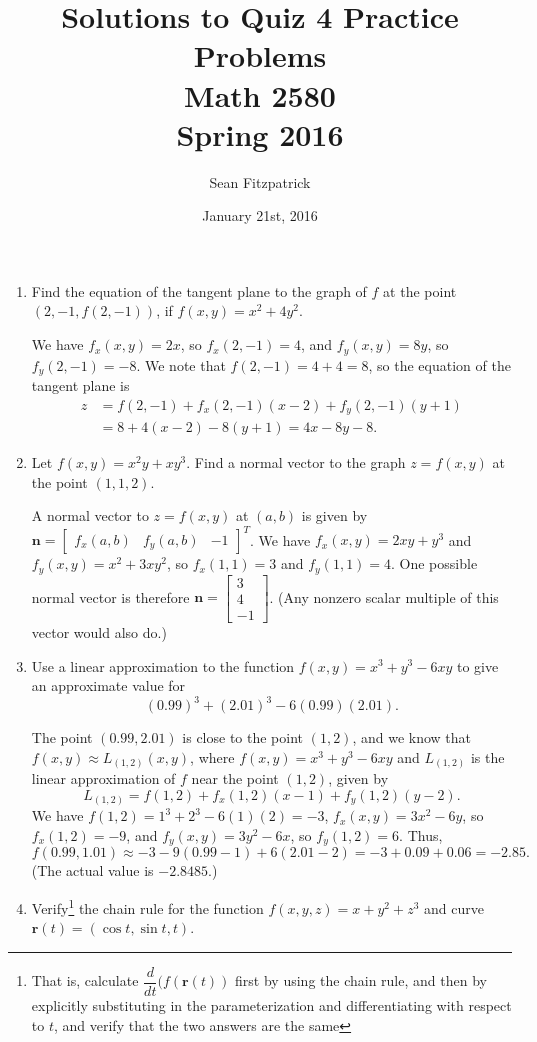 \documentclass[letterpaper,12pt]{article}
\title{Solutions to Quiz 4 Practice Problems\\Math 2580\\Spring 2016}
\author{Sean Fitzpatrick}
\date{January 21st, 2016}
\newcommand{\bbm}{\begin{bmatrix}}
\newcommand{\ebm}{\end{bmatrix}}
\begin{document}
 \maketitle



\begin{enumerate}
 \item Find the equation of the tangent plane to the graph of $f$ at the point $(2,-1,f(2,-1))$, if $f(x,y) = x^2+4y^2$.

\bigskip

We have $f_x(x,y) = 2x$, so $f_x(2,-1) = 4$, and $f_y(x,y) = 8y$, so $f_y(2,-1) = -8$. We note that $f(2,-1) = 4+4=8$, so the equation of the tangent plane is
\begin{align*}
 z &= f(2,-1)+f_x(2,-1)(x-2)+f_y(2,-1)(y+1)\\
&= 8+4(x-2)-8(y+1) = 4x-8y-8.
\end{align*}

 \item Let $f(x,y)=x^2y+xy^3$. Find a normal vector to the graph $z=f(x,y)$ at the point $(1,1,2)$.

\bigskip

A normal vector to $z=f(x,y)$ at $(a,b)$ is given by $\mathbf{n} = \bbm f_x(a,b)&f_y(a,b)&-1\ebm^T$. We have $f_x(x,y) = 2xy+y^3$ and $f_y(x,y) = x^2+3xy^2$, so $f_x(1,1) = 3$ and $f_y(1,1) = 4$. One possible normal vector is therefore $\mathbf{n}=\bbm 3\\4\\-1\ebm$. (Any nonzero scalar multiple of this vector would also do.)

\bigskip

 \item Use a linear approximation to the function $f(x,y) = x^3+y^3-6xy$ to give an approximate value for
\[
 (0.99)^3+(2.01)^3-6(0.99)(2.01).
\]

\bigskip

The point $(0.99,2.01)$ is close to the point $(1,2)$, and we know that $f(x,y)\approx L_{(1,2)}(x,y)$, where $f(x,y) = x^3+y^3-6xy$ and $L_{(1,2)}$ is the linear approximation of $f$ near the point $(1,2)$, given by
\[
 L_{(1,2)} = f(1,2)+f_x(1,2)(x-1)+f_y(1,2)(y-2).
\]
We have $f(1,2) = 1^3+2^3-6(1)(2) = -3$, $f_x(x,y) = 3x^2-6y$, so $f_x(1,2) = -9$, and $f_y(x,y) = 3y^2-6x$, so $f_y(1,2) = 6$. Thus,
\[
 f(0.99,1.01) \approx -3-9(0.99-1)+6(2.01-2) = -3+0.09+0.06 = -2.85.
\]
(The actual value is $-2.8485$.)

 \item Verify\footnote{That is, calculate $\dfrac{d}{dt}(f(\mathbf{r}(t))$ first by using the chain rule, and then by explicitly substituting in the parameterization and differentiating with respect to $t$, and verify that the two answers are the same} the chain rule for the function $f(x,y,z) = x+y^2+z^3$ and curve $\mathbf{r}(t)=(\cos t,\sin t, t)$.


\end{enumerate}
\end{document}
